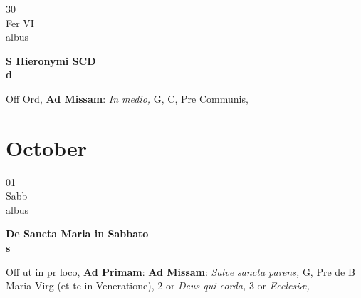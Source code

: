 \documentclass[10pt, openany]{book}
\begin{document}
        \begin{center}
            \begin{minipage}{3.5in}
                \vspace{2em}
                \begin{minipage}{0.5in}
                    {\Huge 30} \\
                    {\normalsize Fer VI} \\
                    {\normalsize albus}
                \end{minipage}
                \begin{minipage}{3.0in}
                    \textbf{ \large S Hieronymi SCD \\
                    \textnormal{\normalsize d}} \\ 
                \end{minipage}
                \begin{justify}Off Ord, \textbf{Ad Missam}: \textit{In medio,} G, C, Pre Communis,  
                \end{justify}
            \end{minipage}
        \end{center}
    
        \chapter{October}
                        
        \begin{center}
            \begin{minipage}{3.5in}
                \vspace{2em}
                \begin{minipage}{0.5in}
                    {\Huge 01} \\
                    {\normalsize Sabb} \\
                    {\normalsize albus}
                \end{minipage}
                \begin{minipage}{3.0in}
                    \textbf{ \large De Sancta Maria in Sabbato \\
                    \textnormal{\normalsize s}} \\ 
                \end{minipage}
                \begin{justify}Off ut in pr loco, \textbf{Ad Primam}: \textbf{Ad Missam}: \textit{Salve sancta parens,} G, Pre de B Maria Virg (et te in Veneratione), 2 or \textit{Deus qui corda,} 3 or \textit{Ecclesiæ,}  
                \end{justify}
            \end{minipage}
        \end{center}
    
\end{document}
